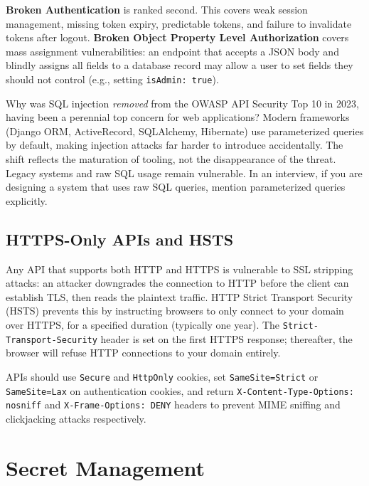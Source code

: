 \documentclass[11pt,a4paper]{article}
\begin{document}
\textbf{Broken Authentication} is ranked second. This covers weak session management, missing token expiry, predictable tokens, and failure to invalidate tokens after logout. \textbf{Broken Object Property Level Authorization} covers mass assignment vulnerabilities: an endpoint that accepts a JSON body and blindly assigns all fields to a database record may allow a user to set fields they should not control (e.g., setting \texttt{isAdmin: true}).

\begin{thinkbox}
Why was SQL injection \textit{removed} from the OWASP API Security Top 10 in 2023, having been a perennial top concern for web applications? Modern frameworks (Django ORM, ActiveRecord, SQLAlchemy, Hibernate) use parameterized queries by default, making injection attacks far harder to introduce accidentally. The shift reflects the maturation of tooling, not the disappearance of the threat. Legacy systems and raw SQL usage remain vulnerable. In an interview, if you are designing a system that uses raw SQL queries, mention parameterized queries explicitly.
\end{thinkbox}

\subsection{HTTPS-Only APIs and HSTS}

Any API that supports both HTTP and HTTPS is vulnerable to SSL stripping attacks: an attacker downgrades the connection to HTTP before the client can establish TLS, then reads the plaintext traffic. HTTP Strict Transport Security (HSTS) prevents this by instructing browsers to only connect to your domain over HTTPS, for a specified duration (typically one year). The \texttt{Strict-Transport-Security} header is set on the first HTTPS response; thereafter, the browser will refuse HTTP connections to your domain entirely.

APIs should use \texttt{Secure} and \texttt{HttpOnly} cookies, set \texttt{SameSite=Strict} or \texttt{SameSite=Lax} on authentication cookies, and return \texttt{X-Content-Type-Options: nosniff} and \texttt{X-Frame-Options: DENY} headers to prevent MIME sniffing and clickjacking attacks respectively.

\section{Secret Management}
\end{document}

